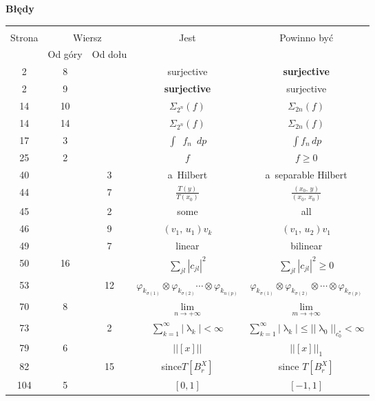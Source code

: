\documentclass[a4paper,11pt]{article}
\newcommand{\fr}{\frac}
\newcommand{\ra}{\rightarrow}
\newcommand{\la}{\uplambda}
\newcommand{\vp}{\varphi}
\newcommand{\si}{\sigma}
\newcommand{\Si}{\Sigma}
\newcommand{\ot}{\otimes}
\newcommand{\Lim}{\lim\limits}
\newcommand{\Sum}{\sum\limits}
\newcommand{\Int}{\int\limits}
\newcommand{\IntCaD}[2] { \Int #1 \, d#2 } %
\providecommand{\absj}[1]{\lvert #1 \rvert}
\providecommand{\absd}[1]{\left| #1 \right|}
\providecommand{\absd}[1]{\left| \, #1 \, \right|}
\newcommand{\norm}[1]{\left|\left| #1 \right|\right|}
\newcommand{\tb}{\textbf}
\newcommand{\Center}[1]{\begin{center} #1 \end{center}}
\newcommand{\CenterTB}[1]{\Center{\tb{#1}}}
\newcommand{\SP}[2]{( #1, \, #2 )} %
\begin{document}
\newpage
\CenterTB{Błędy}
\begin{center}
  \begin{tabular}{|c|c|c|c|c|}
    \hline
    & \multicolumn{2}{c|}{} & & \\
    Strona & \multicolumn{2}{c|}{Wiersz}& Jest & Powinno być \\ \cline{2-3}
    & Od góry & Od dołu &  &  \\ \hline
    2 & 8 & & surjective & \tb{surjective} \\
    2 & 9 & & \tb{surjective} & surjective \\
    14 & 10 & & $\Si_{ 2^{ n } }( f )$ & $\Si_{ 2 n }( f )$ \\
    14 & 14 & & $\Si_{ 2^{ n } }( f )$ & $\Si_{ 2 n }( f )$ \\
    17 & 3 & & $\int \;\: f_{ n } \;\: dp$ & $\IntCaD{ f_{ n } }{ p }$ \\
    25 & 2 & & $f$ & $f \geq 0$ \\
    40 & & 3 & a~Hilbert & a~separable Hilbert \\
    44 & & 7 & $\fr{ T( y ) }{ T( x_{ 0 } ) }$
           & $\fr{ \SP{ x_{ 0 } }{ y } }{ \SP{ x_{ 0 } }{ x_{ 0 } } }$ \\
    45 & & 2 & some & all \\
    46 & & 9 & $\SP{ v_{ 1 } }{ u_{ 1 } } v_{ k }$
           & $\SP{ v_{ 1 } }{ u_{ 2 } } v_{ 1 }$ \\
    49 & & 7 & linear & bilinear \\
    50 & 16 & & $\Sum_{ j l } \absd{ c_{ j l } }^{ 2 }$
           & $\Sum_{ j l } \absd{ c_{ j l } }^{ 2 } \geq 0$ \\
    53 & & 12 & $\vp_{ k_{ \si( 1 ) } } \ot \vp_{ k_{ \si( 2 ) } } \cdots
                \ot \vp_{ k_{ n( p ) } }$
           & $\vp_{ k_{ \si( 1 ) } } \ot \vp_{ k_{ \si( 2 ) } } \ot \cdots
             \ot \vp_{ k_{ \si( p ) } }$ \\
    70 & 8 & & $\Lim_{ n \ra +\infty }$ & $\Lim_{ m \ra +\infty }$ \\ %
    73 & & 2 & $\Sum_{ k = 1 }^{ \infty } \absd{ \la_{ k } } < \infty$
           & $\Sum_{ k = 1 }^{ \infty } \absj{ \la_{ k } } \leq
             \norm{ \la_{ 0 } }_{ c_{ 0 }^{ * } } < \infty$ \\
    79 & 6 & & $\norm{ [x] }$ & $\norm{ [x] }_{ 1 }$ \\
    82 & & 15 & since$T[ B_{ r }^{ X } ]$ & since $T[ B_{ r }^{ X } ]$ \\
    104 & 5 & & $[ 0, 1 ]$ & $[ -1, 1 ]$ \\

\end{tabular}
\end{center}
\end{document}
